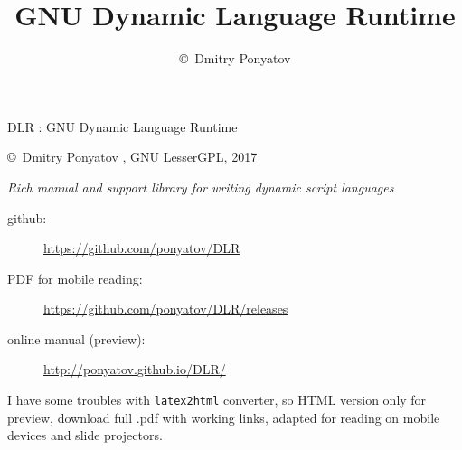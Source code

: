 

\title{GNU Dynamic Language Runtime}
\author{\copyright\ Dmitry Ponyatov }


\maketitle

{\Large DLR : GNU Dynamic Language Runtime}

\bigskip
\copyright\ Dmitry Ponyatov  , GNU LesserGPL, 2017

\bigskip
\emph{Rich manual and support library for writing dynamic script languages}  
\bigskip

\begin{description}
\item[github:] \url{https://github.com/ponyatov/DLR}
\item[PDF for mobile reading:] \url{https://github.com/ponyatov/DLR/releases}
\item[online manual (preview):] \url{http://ponyatov.github.io/DLR/}
\end{description}

\noindent
I have some troubles with \verb|latex2html| converter, so HTML version only for
preview, download full .pdf with working links, adapted for reading on mobile
devices and slide projectors.

\tableofcontents











